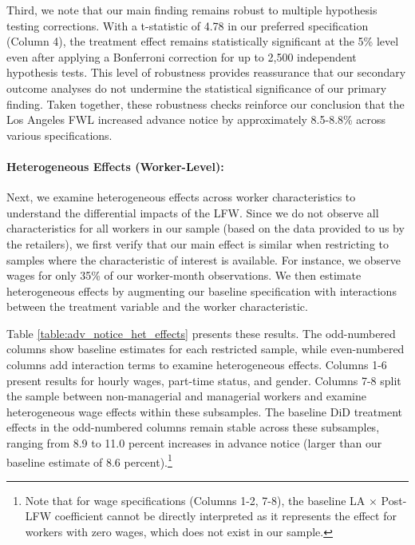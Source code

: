 \documentclass[letterpaper,11pt,leqno]{article}
\theoremstyle{paper}
\begin{document}
Third, we note that our main finding remains robust to multiple hypothesis testing corrections. With a t-statistic of 4.78 in our preferred specification (Column 4), the treatment effect remains statistically significant at the 5\% level even after applying a Bonferroni correction for up to 2,500 independent hypothesis tests. This level of robustness provides reassurance that our secondary outcome analyses do not undermine the statistical significance of our primary finding. Taken together, these robustness checks reinforce our conclusion that the Los Angeles FWL increased advance notice by approximately 8.5-8.8\% across various specifications.


\paragraph{Heterogeneous Effects (Worker-Level):}
Next, we examine heterogeneous effects across worker characteristics to understand the differential impacts of the LFW. Since we do not observe all characteristics for all workers in our sample (based on the data provided to us by the retailers), we first verify that our main effect is similar when restricting to samples where the characteristic of interest is available. For instance, we observe wages for only 35\% of our worker-month observations. We then estimate heterogeneous effects by augmenting our baseline specification with interactions between the treatment variable and the worker characteristic.

Table \ref{table:adv_notice_het_effects} presents these results. The odd-numbered columns show baseline estimates for each restricted sample, while even-numbered columns add interaction terms to examine heterogeneous effects. Columns 1-6 present results for hourly wages, part-time status, and gender. Columns 7-8 split the sample between non-managerial and managerial workers and examine heterogeneous wage effects within these subsamples. The baseline DiD treatment effects in the odd-numbered columns remain stable across these subsamples, ranging from 8.9 to 11.0 percent increases in advance notice (larger than our baseline estimate of 8.6 percent).\footnote{Note that for wage specifications (Columns 1-2, 7-8), the baseline LA $\times$ Post-LFW coefficient cannot be directly interpreted as it represents the effect for workers with zero wages, which does not exist in our sample.} 
\end{document}
